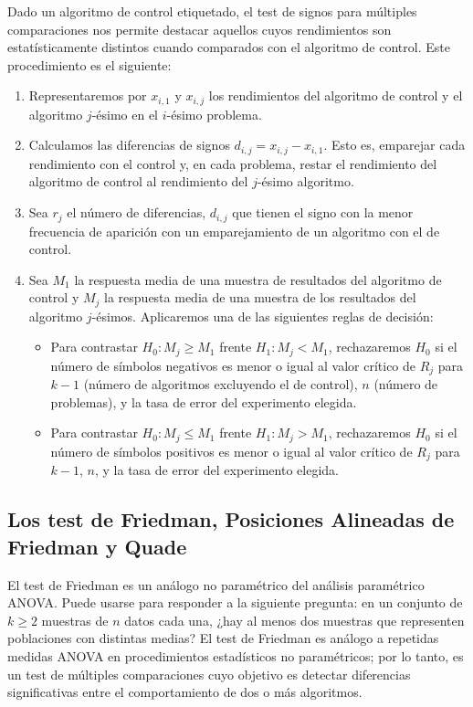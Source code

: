 Dado un algoritmo de control etiquetado, el test de signos para múltiples comparaciones nos permite destacar aquellos cuyos rendimientos son estatísticamente distintos cuando comparados con el algoritmo de control. 
Este procedimiento es el siguiente:
\begin{enumerate}
	\item Representaremos por $x_{i,1}$ y $x_{i,j}$ los rendimientos del algoritmo de control y el algoritmo $j$-ésimo en el $i$-ésimo problema.
	\item Calculamos las diferencias de signos $d_{i,j} = x_{i,j} - x_{i,1}$. 
Esto es, emparejar cada rendimiento con el control y, en cada problema, restar el rendimiento del algoritmo de control al rendimiento del $j$-ésimo algoritmo. 
	\item Sea $r_j$ el número de diferencias, $d_{i,j}$ que tienen el signo con la menor frecuencia de aparición con un emparejamiento de un algoritmo con el de control. 
	\item Sea $M_1$ la respuesta media de una muestra de resultados del algoritmo de control y $M_j$ la respuesta media de una muestra de los resultados del algoritmo $j$-ésimos. 
Aplicaremos una de las siguientes reglas de decisión:
	\begin{itemize}
		\item Para contrastar $H_0 : M_j \geq M_1$ frente $H_1:M_j < M_1$, rechazaremos $H_0$ si el número de símbolos negativos es menor o igual al valor crítico de $R_j$ para $k-1$ (número de algoritmos excluyendo el de control), $n$ (número de problemas), y la tasa de error del experimento elegida. 
		\item Para contrastar $H_0 : M_j \leq M_1$ frente $H_1:M_j > M_1$, rechazaremos $H_0$ si el número de símbolos positivos es menor o igual al valor crítico de $R_j$ para $k-1$, $n$, y la tasa de error del experimento elegida.  
	\end{itemize}
\end{enumerate}

\subsection{Los test de Friedman, Posiciones Alineadas de Friedman y Quade}

El test de Friedman es un análogo no paramétrico del análisis paramétrico ANOVA. 
Puede usarse para responder a la siguiente pregunta: 
en un conjunto de $k\geq 2$ muestras de $n$ datos cada una, ¿hay al menos dos muestras que representen poblaciones con distintas medias? 
El test de Friedman es análogo a repetidas medidas ANOVA en procedimientos estadísticos no paramétricos; por lo tanto, es un test de múltiples comparaciones cuyo objetivo es detectar diferencias significativas entre el comportamiento de dos o más algoritmos. 

